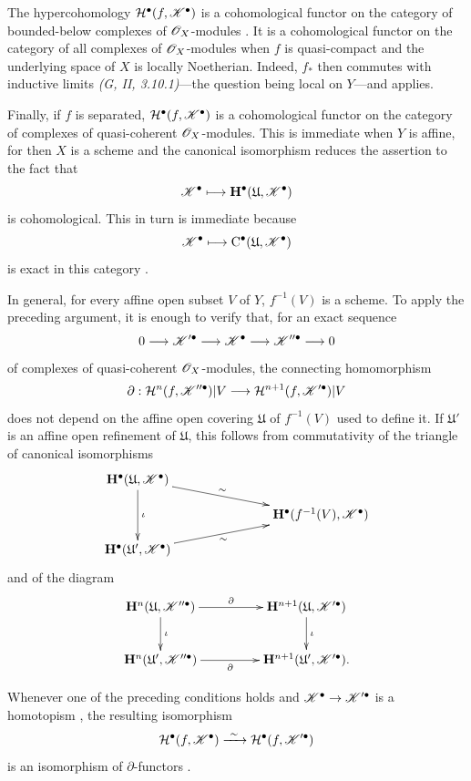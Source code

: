\begin{env}[6.2.6]
\label{III.6.2.6}
The hypercohomology
$\mathcal{H}^\bullet(f,\mathscr{K}^\bullet)$ is a cohomological functor
on the category of bounded-below complexes of $\mathscr{O}_X$-modules
.  It is a cohomological functor on the category
of all complexes of $\mathscr{O}_X$-modules when $f$ is quasi-compact
and the underlying space of $X$ is locally Noetherian.  Indeed,
$f_*$ then commutes with inductive limits
\emph{(G, II, 3.10.1)}---the question being local on $Y$---and
 applies.

Finally, if $f$ is separated,
$\mathcal{H}^\bullet(f,\mathscr{K}^\bullet)$ is a cohomological functor
on the category of complexes of quasi-coherent
$\mathscr{O}_X$-modules.  This is immediate when $Y$ is affine, for
then $X$ is a scheme and the canonical isomorphism
 reduces the assertion to the fact that
\[
  \mathscr{K}^\bullet\longmapsto
  \mathbf{H}^\bullet(\mathfrak{U},\mathscr{K}^\bullet)
\]
is cohomological.  This in turn is immediate because
\[
  \mathscr{K}^\bullet\longmapsto
  \mathrm{C}^\bullet(\mathfrak{U},\mathscr{K}^\bullet)
\]
is exact in this category .

In general, for every affine open subset $V$ of $Y$,
$f^{-1}(V)$ is a scheme.  To apply the preceding argument, it is
enough to verify that, for an exact sequence
\[
  0\longrightarrow\mathscr{K}'^\bullet
  \longrightarrow\mathscr{K}^\bullet
  \longrightarrow\mathscr{K}''^\bullet
  \longrightarrow0
\]
of complexes of quasi-coherent $\mathscr{O}_X$-modules, the connecting
homomorphism
\[
  \partial:
  \mathcal{H}^n(f,\mathscr{K}''^\bullet)|V
  \longrightarrow
  \mathcal{H}^{n+1}(f,\mathscr{K}'^\bullet)|V
\]
does not depend on the affine open covering $\mathfrak{U}$ of
$f^{-1}(V)$ used to define it.  If $\mathfrak{U}'$ is an affine
open refinement of $\mathfrak{U}$, this follows from commutativity
of the triangle of canonical isomorphisms
\[
  \xymatrix@C=34pt@R=11pt{
    \mathbf{H}^\bullet(\mathfrak{U},\sh{K}^\bullet)
      \ar[rrd]^-{\sim}
      \ar[dd]^{\iota}
    && \\
    &&
    \mathbf{H}^\bullet(f^{-1}(V),\sh{K}^\bullet)
    \\
    \mathbf{H}^\bullet(\mathfrak{U}',\sh{K}^\bullet)
      \ar[rru]_-{\sim}
    &&
  }
\]
and of the diagram
\[
  \xymatrix@C=46pt@R=25pt{
    \mathbf{H}^n(\mathfrak{U},\sh{K}''^\bullet)
      \ar[r]^-{\partial}
      \ar[d]^{\iota}
    &
    \mathbf{H}^{n+1}(\mathfrak{U},\sh{K}'^\bullet)
      \ar[d]^{\iota}
    \\
    \mathbf{H}^n(\mathfrak{U}',\sh{K}''^\bullet)
      \ar[r]_-{\partial}
    &
    \mathbf{H}^{n+1}(\mathfrak{U}',\sh{K}'^\bullet).
  }
\]

Whenever one of the preceding conditions holds and
$\mathscr{K}^\bullet\to\mathscr{K}'^\bullet$ is a homotopism
, the resulting isomorphism
\[
  \mathcal{H}^\bullet(f,\mathscr{K}^\bullet)
  \xrightarrow{\ \sim\ }
  \mathcal{H}^\bullet(f,\mathscr{K}'^\bullet)
\]
is an isomorphism of $\partial$-functors
.
\end{env}

